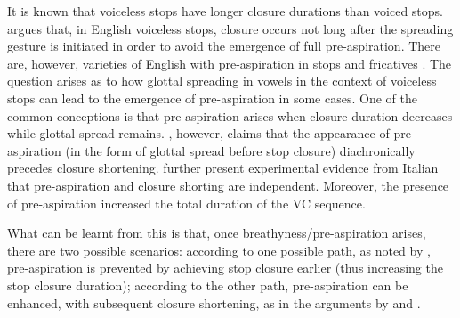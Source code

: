 \documentclass[12pt,a4paper,]{article}
\begin{document}
It is known that voiceless stops have longer closure durations than
voiced stops. \citet{lisker1974} argues that, in English voiceless
stops, closure occurs not long after the spreading gesture is initiated
in order to avoid the emergence of full pre-aspiration. There are,
however, varieties of English with pre-aspiration in stops and
fricatives \citep{gordeeva2007, nance2013, hejna2015a}. The question
arises as to how glottal spreading in vowels in the context of voiceless
stops can lead to the emergence of pre-aspiration in some cases. One of
the common conceptions is that pre-aspiration arises when closure
duration decreases while glottal spread remains. \citet{nichasaide1985},
however, claims that the appearance of pre-aspiration (in the form of
glottal spread before stop closure) diachronically precedes closure
shortening. \citet{stevens2014} further present experimental evidence
from Italian that pre-aspiration and closure shorting are independent.
Moreover, the presence of pre-aspiration increased the total duration of
the VC sequence.

What can be learnt from this is that, once breathyness/pre-aspiration
arises, there are two possible scenarios: according to one possible
path, as noted by \citet{lisker1974}, pre-aspiration is prevented by
achieving stop closure earlier (thus increasing the stop closure
duration); according to the other path, pre-aspiration can be enhanced,
with subsequent closure shortening, as in the arguments by
\citet{nichasaide1985} and \citet{stevens2014}.


\end{document}
